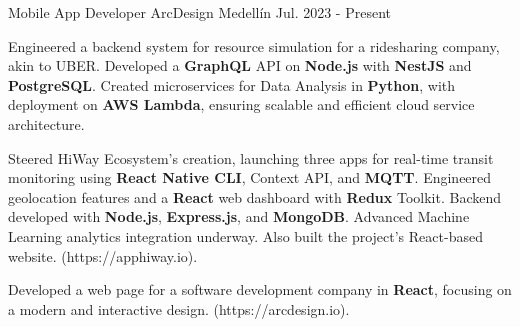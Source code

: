 
\begin{cventries}

  \cventry
  {Mobile App Developer} %
  {ArcDesign} %
  {Medellín} %
  {Jul. 2023 - Present} %
  {
    \begin{cvitems} %
      \item {Engineered a backend system for resource simulation for a ridesharing company, akin to UBER. Developed a \textbf{GraphQL} API on
      \textbf{Node.js} with \textbf{NestJS} and \textbf{PostgreSQL}. Created microservices for Data Analysis in \textbf{Python}, with deployment on \textbf{AWS Lambda},
      ensuring scalable and efficient cloud service architecture}.
      \item {Steered HiWay Ecosystem’s creation, launching three apps for real-time transit monitoring using \textbf{React Native CLI}, Context
      API, and \textbf{MQTT}. Engineered geolocation features and a \textbf{React} web dashboard with \textbf{Redux} Toolkit. Backend developed with
      \textbf{Node.js}, \textbf{Express.js}, and \textbf{MongoDB}. Advanced Machine Learning analytics integration underway. Also built the project’s
      React-based website. (https://apphiway.io)}.
      \item {Developed a web page for a software development company in \textbf{React}, focusing on a modern and interactive design.
      (https://arcdesign.io)}.
    \end{cvitems}
  }
\end{cventries}
